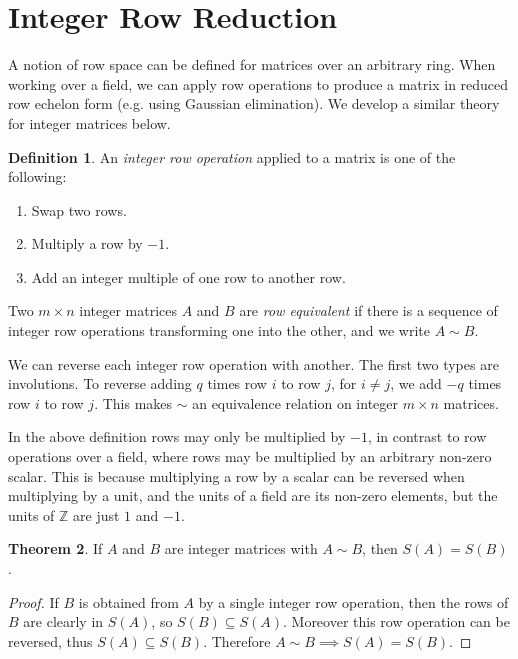 \documentclass[12pt,a4paper,answers]{exam}
\newcommand{\Z}{\mathbb{Z}}
\theoremstyle{definition}
\newtheorem{theorem}{Theorem}[section]
\newtheorem{definition}[theorem]{Definition}
\begin{document}
\section{Integer Row Reduction}

A notion of row space can be defined for matrices over an arbitrary ring. When working over a field, we can apply row operations to produce a matrix in reduced row echelon form (e.g. using Gaussian elimination). We develop a similar theory for integer matrices below.

\begin{definition}
  An \emph{integer row operation} applied to a matrix is one of the following:
  \begin{enumerate}
  \item Swap two rows.
  \item Multiply a row by $-1$.
  \item Add an integer multiple of one row to another row.
  \end{enumerate}
  Two $m\times n$ integer matrices $A$ and $B$ are \emph{row equivalent} if there is a sequence of integer row operations transforming one into the other, and we write $A\sim B$.
\end{definition}

We can reverse each integer row operation with another. The first two types are involutions. To reverse adding $q$ times row $i$ to row $j$, for $i\neq j$, we add $-q$ times row $i$ to row $j$. This makes $\sim$ an equivalence relation on integer $m\times n$ matrices.

In the above definition rows may only be multiplied by $-1$, in contrast to row operations over a field, where rows may be multiplied by an arbitrary non-zero scalar. This is because multiplying a row by a scalar can be reversed when multiplying by a unit, and the units of a field are its non-zero elements, but the units of $\Z$ are just $1$ and $-1$.

\begin{theorem}
  If $A$ and $B$ are integer matrices with $A\sim B$, then $S(A)=S(B)$.
\end{theorem}

\begin{proof}
  If $B$ is obtained from $A$ by a single integer row operation, then the rows of $B$ are clearly in $S(A)$, so $S(B)\subseteq S(A)$. Moreover this row operation can be reversed, thus $S(A)\subseteq S(B)$. Therefore $A\sim B\implies S(A)=S(B)$.
\end{proof}
\end{document}

